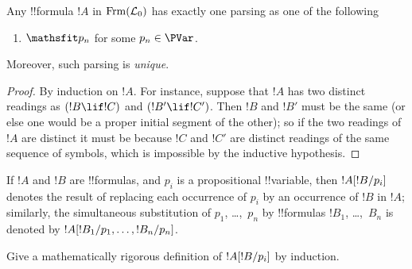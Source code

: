 \documentclass[../../../include/open-logic-section]{subfiles}
\begin{document}
\begin{prop}
Any !!{formula} $!A$ in $ \Frm[L_0]$ has exactly one parsing as one of
the following
\begin{enumerate}


\item $\Obj p_n$ for some $p_n \in  \PVar$.
  





\end{enumerate}
Moreover, such parsing is \emph{unique}.
\end{prop}

\begin{proof}
By induction on $!A$. For instance, suppose that $!A$ has two distinct
readings as $(!B \lif !C)$ and $(!B' \lif !C')$. Then $!B$ and $!B'$
must be the same (or else one would be a proper initial segment of the
other); so if the two readings of $!A$ are distinct it must be because
$!C$ and $!C'$ are distinct readings of the same sequence of symbols,
which is impossible by the inductive hypothesis.
\end{proof}


\begin{defn} 
If $!A$ and $!B$ are !!{formula}s, and $p_i$ is a propositional
!!{variable}, then $!A[!B/p_i]$ denotes the result of
replacing each occurrence of $p_i$ by an occurrence of $!B$ in $!A$;
similarly, the simultaneous substitution of $p_1$, \dots,~$p_n$ by
!!{formula}s $!B_1$, \dots,~$\!B_n$ is denoted by
$!A[!B_1/p_1,\dots,!B_n/p_n]$.
\end{defn}

\begin{prob}
Give a mathematically rigorous definition of $!A[!B/p_i]$ by
induction.
\end{prob}
\end{document}
